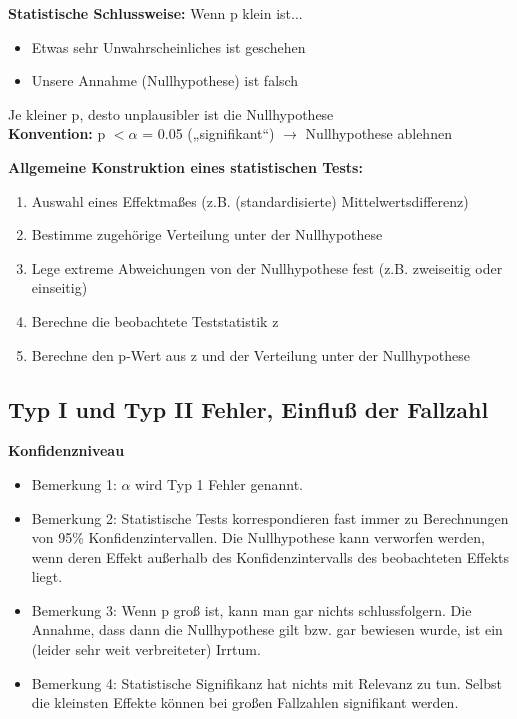 \textbf{Statistische Schlussweise:} Wenn p klein ist...
\begin{itemize}
	\item Etwas sehr Unwahrscheinliches ist geschehen
	\item Unsere Annahme (Nullhypothese) ist falsch
\end{itemize}

Je kleiner p, desto unplausibler ist die Nullhypothese\\
\textbf{Konvention:} p $< \alpha$ = 0.05 („signifikant“) $\rightarrow$ Nullhypothese ablehnen

\newpage
\textbf{Allgemeine Konstruktion eines statistischen Tests:}
\begin{enumerate}
	\item Auswahl eines Effektmaßes (z.B. (standardisierte) Mittelwertsdifferenz)
	\item Bestimme zugehörige Verteilung unter der Nullhypothese
	\item Lege extreme Abweichungen von der Nullhypothese fest (z.B. zweiseitig oder einseitig)
	\item Berechne die beobachtete Teststatistik z
	\item Berechne den p-Wert aus z und der Verteilung unter der Nullhypothese
\end{enumerate}

\subsection{Typ I und Typ II Fehler, Einfluß der Fallzahl}
\textbf{Konfidenzniveau}
\begin{itemize}
	\item Bemerkung 1: $\alpha$ wird Typ 1 Fehler genannt.
	\item Bemerkung 2: Statistische Tests korrespondieren fast immer zu Berechnungen von 95\% Konfidenzintervallen. Die Nullhypothese kann verworfen werden, wenn deren Effekt außerhalb des Konfidenzintervalls des beobachteten Effekts liegt.
	\item Bemerkung 3: Wenn p groß ist, kann man gar nichts schlussfolgern. Die Annahme, dass dann die Nullhypothese gilt bzw. gar bewiesen wurde, ist ein (leider sehr weit verbreiteter) Irrtum.
	\item Bemerkung 4: Statistische Signifikanz hat nichts mit Relevanz zu tun. Selbst die kleinsten Effekte können bei großen Fallzahlen signifikant werden.
\end{itemize}

